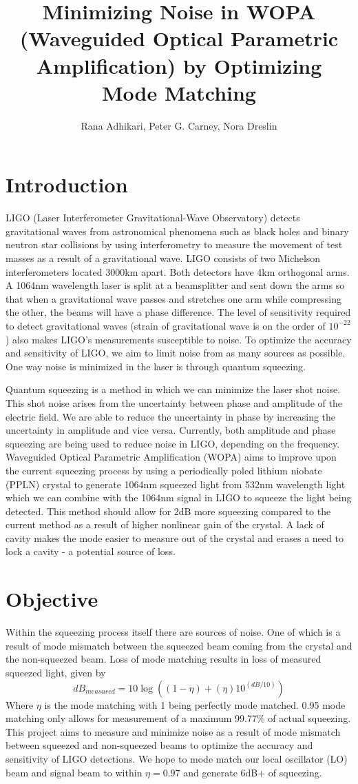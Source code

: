 \documentclass[colorlinks=true,pdfstartview=FitV,linkcolor=blue,
citecolor=red,urlcolor=magenta]{ligodoc}
\title{Minimizing Noise in WOPA (Waveguided Optical Parametric Amplification) by Optimizing Mode Matching}
\author{Rana Adhikari, Peter G. Carney, Nora Dreslin}
\begin{document}
\tableofcontents

\newpage
\section{Introduction}
LIGO (Laser Interferometer Gravitational-Wave Observatory) detects gravitational waves from astronomical phenomena such as black holes and binary neutron star collisions by using interferometry to measure the movement of test masses as a result of a gravitational wave. LIGO consists of two Michelson interferometers located 3000km apart. Both detectors have 4km orthogonal arms. A 1064nm wavelength laser is split at a beamsplitter and sent down the arms so that when a gravitational wave passes and stretches one arm while compressing the other, the beams will have a phase difference. The level of sensitivity required to detect gravitational waves (strain of gravitational wave is on the order of $10^{-22}$) also makes LIGO's measurements susceptible to noise. To optimize the accuracy and sensitivity of LIGO, we aim to limit noise from as many sources as possible. One way noise is minimized in the laser is through quantum squeezing. 

Quantum squeezing is a method in which we can minimize the laser shot noise. This shot noise arises from the uncertainty between phase and amplitude of the electric field. We are able to reduce the uncertainty in phase by increasing the uncertainty in amplitude and vice versa. Currently, both amplitude and phase squeezing are being used to reduce noise in LIGO, depending on the frequency. Waveguided Optical Parametric Amplification (WOPA) aims to improve upon the current squeezing process by using a periodically poled lithium niobate (PPLN) crystal to generate 1064nm squeezed light from 532nm wavelength light which we can combine with the 1064nm signal in LIGO to squeeze the light being detected. This method should allow for 2dB more squeezing compared to the current method as a result of higher nonlinear gain of the crystal. A lack of cavity makes the mode easier to measure out of the crystal and erases a need to lock a cavity - a potential source of loss. 
\section{Objective}
Within the squeezing process itself there are sources of noise. One of which is a result of mode mismatch between the squeezed beam coming from the crystal and the non-squeezed beam. Loss of mode matching results in loss of measured squeezed light, given by
$$dB_{measured} = 10\log((1-\eta) + (\eta)10^{(dB/10)})$$
Where $\eta$ is the mode matching with 1 being perfectly mode matched. 0.95 mode matching only allows for measurement of a maximum 99.77\% of actual squeezing. This project aims to measure and minimize noise as a result of mode mismatch between squeezed and non-squeezed beams to optimize the accuracy and sensitivity of LIGO detections.
We hope to mode match our local oscillator (LO) beam and signal beam to within $\eta=0.97$ and generate 6dB+ of squeezing.
\end{document}

